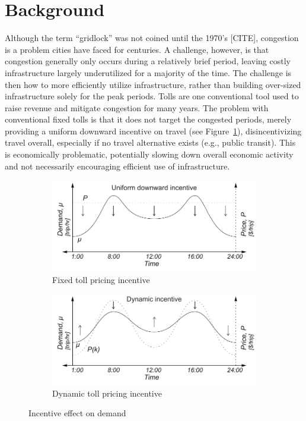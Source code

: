 \documentclass[10pt, letter, twocolumn]{article} %
\begin{document}
\section{Background}
Although the term ``gridlock'' was not coined until the 1970's [CITE], congestion is a problem cities have faced for centuries. A challenge, however, is that congestion generally only occurs during a relatively brief period, leaving costly infrastructure largely underutilized for a majority of the time. The challenge is then how to more efficiently utilize infrastructure, rather than building over-sized infrastructure solely for the peak periods. Tolls are one conventional tool used to raise revenue and mitigate congestion for many years. The problem with conventional fixed tolls is that it does not target the congested periods, merely providing a uniform downward incentive on travel (see Figure~\ref{fig:flatprice}), disincentivizing travel overall, especially if no travel alternative exists (e.g., public transit). This is economically problematic, potentially slowing down overall economic activity and not necessarily encouraging efficient use of infrastructure. 

\begin{figure}

\begin{subfigure}[h]{\linewidth}
	\includegraphics[width=\textwidth]{figures/flatprice}
	\centering
	\caption{Fixed toll pricing incentive}
	\label{fig:flatprice}
\end{subfigure}
\begin{subfigure}[h]{\linewidth}
	\includegraphics[width=\textwidth]{figures/dynamicprice}
	\centering
	\caption{Dynamic toll pricing incentive}
	\label{fig:dynamicprice}
\end{subfigure}
\label{fig:incentives}
\caption{Incentive effect on demand}
\end{figure}
\end{document}
